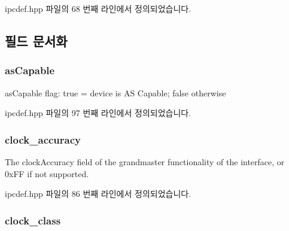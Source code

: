 ipcdef.\+hpp 파일의 68 번째 라인에서 정의되었습니다.



\subsection{필드 문서화}
\subsubsection[{\texorpdfstring{as\+Capable}{asCapable}}]{ as\+Capable}\hypertarget{structg_ptp_time_data_a15a09cf240fb37b905e4d4e1e9f5b9a1}{}\label{structg_ptp_time_data_a15a09cf240fb37b905e4d4e1e9f5b9a1}


as\+Capable flag\+: true = device is AS Capable; false otherwise 



ipcdef.\+hpp 파일의 97 번째 라인에서 정의되었습니다.

\subsubsection[{\texorpdfstring{clock\+\_\+accuracy}{clock_accuracy}}]{ clock\+\_\+accuracy}\hypertarget{structg_ptp_time_data_a708d6d971b6be997cf8d3e683951ceb0}{}\label{structg_ptp_time_data_a708d6d971b6be997cf8d3e683951ceb0}


The clock\+Accuracy field of the grandmaster functionality of the interface, or 0x\+FF if not supported. 



ipcdef.\+hpp 파일의 86 번째 라인에서 정의되었습니다.

\subsubsection[{\texorpdfstring{clock\+\_\+class}{clock_class}}]{ clock\+\_\+class}\hypertarget{structg_ptp_time_data_aafe98ca785cdce0ce5eaa26f2930d2fe}{}\label{structg_ptp_time_data_aafe98ca785cdce0ce5eaa26f2930d2fe}


